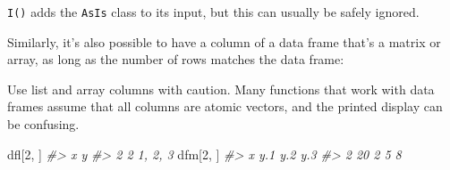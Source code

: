 \documentclass[]{book}
\newenvironment{Shaded}{\begin{snugshade}}{\end{snugshade}}
\newcommand{\CommentTok}[1]{\textcolor[rgb]{0.56,0.35,0.01}{\textit{#1}}}
\newcommand{\DataTypeTok}[1]{\textcolor[rgb]{0.13,0.29,0.53}{#1}}
\newcommand{\DecValTok}[1]{\textcolor[rgb]{0.00,0.00,0.81}{#1}}
\newcommand{\KeywordTok}[1]{\textcolor[rgb]{0.13,0.29,0.53}{\textbf{#1}}}
\newcommand{\NormalTok}[1]{#1}
\newcommand{\OperatorTok}[1]{\textcolor[rgb]{0.81,0.36,0.00}{\textbf{#1}}}
\newcommand{\StringTok}[1]{\textcolor[rgb]{0.31,0.60,0.02}{#1}}
\theoremstyle{definition}
\theoremstyle{definition}
\theoremstyle{definition}
\theoremstyle{remark}
\begin{document}
\begin{Shaded}
\end{Shaded}

\texttt{I()} adds the \texttt{AsIs} class to its input, but this can
usually be safely ignored.

Similarly, it's also possible to have a column of a data frame that's a
matrix or array, as long as the number of rows matches the data frame:

\begin{Shaded}
\end{Shaded}

Use list and array columns with caution. Many functions that work with
data frames assume that all columns are atomic vectors, and the printed
display can be confusing.

\begin{Shaded}
\begin{Highlighting}[]
\NormalTok{dfl[}\DecValTok{2}\NormalTok{, ]}
\CommentTok{#>   x       y}
\CommentTok{#> 2 2 1, 2, 3}
\NormalTok{dfm[}\DecValTok{2}\NormalTok{, ]}
\CommentTok{#>    x y.1 y.2 y.3}
\CommentTok{#> 2 20   2   5   8}
\end{Highlighting}
\end{Shaded}
\end{document}
